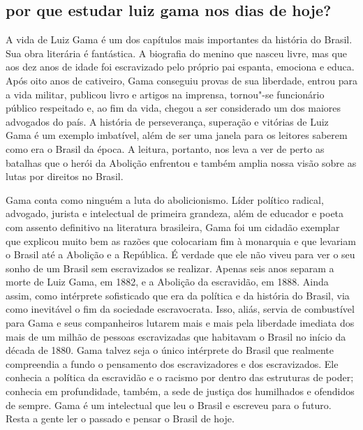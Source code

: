\subsection{por que estudar luiz gama nos dias de hoje?}

A vida de Luiz Gama é um dos capítulos mais importantes da história do
Brasil. Sua obra literária é fantástica. A biografia do menino que
nasceu livre, mas que aos dez anos de idade foi escravizado pelo próprio
pai espanta, emociona e educa. Após oito anos de cativeiro, Gama
conseguiu provas de sua liberdade, entrou para a vida militar, publicou
livro e artigos na imprensa, tornou"-se funcionário público respeitado e,
ao fim da vida, chegou a ser considerado um dos maiores advogados do
país. A história de perseverança, superação e vitórias de Luiz Gama é um
exemplo imbatível, além de ser uma janela para os leitores saberem como
era o Brasil da época. A leitura, portanto, nos leva a ver de perto as
batalhas que o herói da Abolição enfrentou e também amplia nossa visão
sobre as lutas por direitos no Brasil.

Gama conta como ninguém a luta do abolicionismo. Líder político radical,
advogado, jurista e intelectual de primeira grandeza, além de educador e
poeta com assento definitivo na literatura brasileira, Gama foi um
cidadão exemplar que explicou muito bem as razões que colocariam fim à
monarquia e que levariam o Brasil até a Abolição e a República. É
verdade que ele não viveu para ver o seu sonho de um Brasil sem
escravizados se realizar. Apenas seis anos separam a morte de Luiz Gama,
em 1882, e a Abolição da escravidão, em 1888. Ainda assim, como
intérprete sofisticado que era da política e da história do Brasil, via
como inevitável o fim da sociedade escravocrata. Isso, aliás, servia de
combustível para Gama e seus companheiros lutarem mais e mais pela
liberdade imediata dos mais de um milhão de pessoas escravizadas que
habitavam o Brasil no início da década de 1880. Gama talvez seja o único
intérprete do Brasil que realmente compreendia a fundo o pensamento dos
escravizadores e dos escravizados. Ele conhecia a política da escravidão
e o racismo por dentro das estruturas de poder; conhecia em
profundidade, também, a sede de justiça dos humilhados e ofendidos de
sempre. Gama é um intelectual que leu o Brasil e escreveu para o futuro.
Resta a gente ler o passado e pensar o Brasil de hoje.


